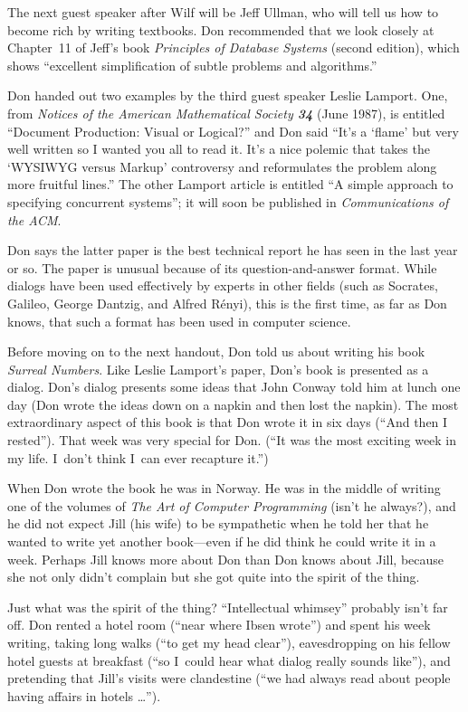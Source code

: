 The next guest speaker after Wilf will be Jeff Ullman, who will tell us
how to become rich by writing textbooks. Don recommended that we
look closely at Chapter~11 of Jeff's book {\sl Principles of Database
Systems\/} (second edition), which shows ``excellent simplification of
subtle problems and algorithms.''

Don handed out two examples by the third guest speaker Leslie Lamport.
One, from {\sl Notices of the American Mathematical Society\/ \bf34}
(June 1987), is entitled ``Document Production: Visual or Logical?'' and
Don said ``It's a `flame' but very well written so I wanted you all to
read it. It's a nice polemic that takes the `WYSIWYG versus Markup'
controversy and reformulates the problem along more fruitful lines.''
The other Lamport article is entitled ``A simple approach to specifying
concurrent systems''; it will soon be published in {\sl Communications
of the ACM}.

Don says the latter paper is the best technical
report he has seen in the last year or so.  The paper is unusual because
of its question-and-answer format. While dialogs have been used 
effectively by experts
in other fields (such as Socrates, Galileo, George Dantzig,
and Alfred R\'enyi), this is the first time, as far as Don knows, that such a format
has been used in computer science.

\medskip
    Before moving on to the next handout, Don told us about writing his book
{\sl Surreal Numbers}.  Like Leslie Lamport's paper, Don's book is presented
    as a dialog.
 Don's dialog presents some ideas that John Conway told him
 at lunch one day (Don wrote the ideas down on a napkin and then lost
    the napkin).  The most extraordinary aspect of this book is that Don wrote
    it in six days (``And then I rested'').  That week was very special for Don.
    (``It was the most exciting week in my life.  I~don't think I~can ever
    recapture it.'')
    
    When Don wrote the book he was in Norway.  He was in the middle of writing
    one of the volumes of {\sl The Art of Computer Programming\/} (isn't he
    always?), and he did not expect Jill (his wife) to be sympathetic when he
    told her that he wanted to write yet another book---even if he did think he
    could write it in a week.  Perhaps Jill knows more about Don than Don
    knows about Jill, because she  not only didn't complain but she got
    quite into the spirit of the thing.
    
    Just what was the spirit of the thing?  ``Intellectual whimsey'' probably
    isn't far off.  Don rented a hotel room (``near where Ibsen wrote'') and
    spent his week writing, taking long walks (``to get my head clear''),
    eavesdropping on his fellow hotel guests at breakfast
(``so I~could hear what 
    dialog really sounds like''), and pretending that Jill's visits were 
    clandestine (``we had always read about people having affairs in 
    hotels \dots'').
    
